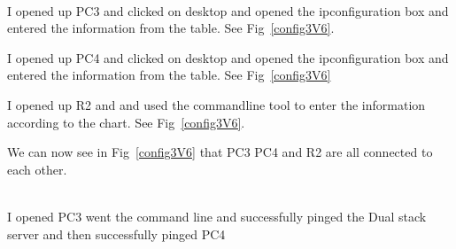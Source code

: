 \documentclass[../EngineeringJournal_CDavis.tex]{subfiles}
\begin{document}
\noindent{}
\\I opened up PC3 and clicked on desktop and opened the ipconfiguration box and
entered the information from the table. See Fig~\ref{config3V6}.

\hfill\break

I opened up PC4 and clicked on desktop and opened the ipconfiguration box and entered
the information from the table. See Fig~\ref{config3V6}

\hfill\break

I opened up R2 and and used the commandline tool to enter the information according to
the chart. See Fig~\ref{config3V6}.

\hfill\break

We can now see in Fig~\ref{config3V6} that PC3 PC4 and R2 are all connected to each other. 

\clearpage

\noindent{}
\\I opened PC3 went the command line and successfully pinged the Dual stack server and then successfully pinged PC4
\end{document}
